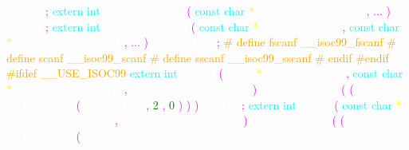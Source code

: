 \textcolor{white}{\_\_wur} 
\textcolor{magenta}{;} 
\textcolor{cyan}{extern} 
\textcolor{cyan}{int} 
\textcolor{white}{\_\_isoc99\_scanf} 
\textcolor{magenta}{(} 
\textcolor{cyan}{const} 
\textcolor{cyan}{char} 
\textcolor{yellow}{*} 
\textcolor{white}{\_\_restrict} 
\textcolor{white}{\_\_format} 
\textcolor{magenta}{,} 
\textcolor{magenta}{...} 
\textcolor{magenta}{)} 
\textcolor{white}{\_\_wur} 
\textcolor{magenta}{;} 
\textcolor{cyan}{extern} 
\textcolor{cyan}{int} 
\textcolor{white}{\_\_isoc99\_sscanf} 
\textcolor{magenta}{(} 
\textcolor{cyan}{const} 
\textcolor{cyan}{char} 
\textcolor{yellow}{*} 
\textcolor{white}{\_\_restrict} 
\textcolor{white}{\_\_s} 
\textcolor{magenta}{,} 
\textcolor{cyan}{const} 
\textcolor{cyan}{char} 
\textcolor{yellow}{*} 
\textcolor{white}{\_\_restrict} 
\textcolor{white}{\_\_format} 
\textcolor{magenta}{,} 
\textcolor{magenta}{...} 
\textcolor{magenta}{)} 
\textcolor{white}{\_\_THROW} 
\textcolor{magenta}{;} 
\textcolor{orange}{\# define fscanf \_\_isoc99\_fscanf} 
\textcolor{orange}{\# define scanf \_\_isoc99\_scanf} 
\textcolor{orange}{\# define sscanf \_\_isoc99\_sscanf} 
\textcolor{orange}{\# endif} 
\textcolor{orange}{\#endif} 
\textcolor{orange}{\#ifdef	\_\_USE\_ISOC99} 
\textcolor{cyan}{extern} 
\textcolor{cyan}{int} 
\textcolor{white}{vfscanf} 
\textcolor{magenta}{(} 
\textcolor{white}{FILE} 
\textcolor{yellow}{*} 
\textcolor{white}{\_\_restrict} 
\textcolor{white}{\_\_s} 
\textcolor{magenta}{,} 
\textcolor{cyan}{const} 
\textcolor{cyan}{char} 
\textcolor{yellow}{*} 
\textcolor{white}{\_\_restrict} 
\textcolor{white}{\_\_format} 
\textcolor{magenta}{,} 
\textcolor{white}{\_\_gnuc\_va\_list} 
\textcolor{white}{\_\_arg} 
\textcolor{magenta}{)} 
\textcolor{white}{\_\_attribute\_\_} 
\textcolor{magenta}{(} 
\textcolor{magenta}{(} 
\textcolor{white}{\_\_format\_\_} 
\textcolor{magenta}{(} 
\textcolor{white}{\_\_scanf\_\_} 
\textcolor{magenta}{,} 
\textcolor{green}{2} 
\textcolor{magenta}{,} 
\textcolor{green}{0} 
\textcolor{magenta}{)} 
\textcolor{magenta}{)} 
\textcolor{magenta}{)} 
\textcolor{white}{\_\_wur} 
\textcolor{magenta}{;} 
\textcolor{cyan}{extern} 
\textcolor{cyan}{int} 
\textcolor{white}{vscanf} 
\textcolor{magenta}{(} 
\textcolor{cyan}{const} 
\textcolor{cyan}{char} 
\textcolor{yellow}{*} 
\textcolor{white}{\_\_restrict} 
\textcolor{white}{\_\_format} 
\textcolor{magenta}{,} 
\textcolor{white}{\_\_gnuc\_va\_list} 
\textcolor{white}{\_\_arg} 
\textcolor{magenta}{)} 
\textcolor{white}{\_\_attribute\_\_} 
\textcolor{magenta}{(} 
\textcolor{magenta}{(} 
\textcolor{white}{\_\_format\_\_} 
\textcolor{magenta}{(} 
